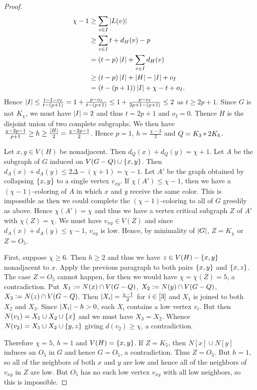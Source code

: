 \begin{proof}
\begin{align*}
	\chi - 1 &\geq \sum_{v \in I} \left|L(v)\right| \\
	&\geq \sum_{v \in I} t + d_H(v) - p \\
	&= (t-p)\left|I\right| + \sum_{v \in I} d_H(v) \\
	&\geq (t-p)\left|I\right| + \left|H\right| - \left|I\right| + o_I \\
	&= (t - (p + 1))\left|I\right| + \chi - t + o_I. 
\end{align*}
Hence $\left|I\right| \leq \frac{t-1 - o_I}{t - (p + 1)} = 1 +
\frac{p-o_I}{t-(p+1)} \leq 1 + \frac{p-o_I}{2p + 1 - (p+1)} \leq 2$ as $t \geq
2p + 1$.  Since $G$ is not $K_\chi$, we must
have $\left|I\right| = 2$ and thus $t = 2p + 1$ and $o_I = 0$.  Thence $H$ is the
disjoint union of two complete subgraphs.  We then have $\frac{\chi - 2p - 1}{p
+ 1} \geq h \geq \frac{\left|H\right|}{2} = \frac{\chi - 2p - 1}{2}$.  Hence $p =
1$, $h = \frac{\chi - 3}{2}$ and $Q = K_3 \mbox{\hspace{2 pt}$\ast$\hspace{2 pt}} 2K_h$.

Let $x,y \in V(H)$ be nonadjacent.  Then $d_Q(x) + d_Q(y) = \chi + 1$.  Let $A$
be the subgraph of $G$ induced on $V(G - Q) \cup \left\{ x,y \right\}$.  Then $d_A(x) + d_A(y) \leq 2\Delta - (\chi + 1) = \chi - 1$.  Let
$A'$ be the graph obtained by collapsing $\left\{ x, y \right\}$ to a single vertex
$v_{xy}$. If $\chi(A') \leq \chi - 1$, then we have a $(\chi - 1)$-coloring of
$A$ in which $x$ and $y$ receive the same color.  This is impossible as then we could
complete the $(\chi - 1)$-coloring to all of $G$ greedily as above.  Hence
$\chi(A') = \chi$ and thus we have a vertex critical subgraph $Z$ of $A'$ with
$\chi(Z) = \chi$.  We must have $v_{xy} \in V(Z)$ and since $d_A(x) + d_A(y)
\leq \chi - 1$, $v_{xy}$ is low.  Hence, by minimality of $\left|G\right|$, $Z =
K_\chi$ or $Z = O_5$.

First, suppose $\chi \geq 6$.  Then $h \geq 2$ and thus we have $z \in V(H) - \left\{ x, y \right\}$ nonadjacent to $x$.  
Apply the previous paragraph to both pairs $\left\{ x, y \right\}$ and $\left\{ x, z \right\}$.  
The case $Z = O_5$ cannot happen, for then we would have $\chi = \chi(Z) = 5$, a contradiction.  
Put $X_1 \mathrel{\mathop:}= N(x) \cap V(G - Q)$, $X_2 \mathrel{\mathop:}= N(y) \cap V(G - Q)$, $X_3 \mathrel{\mathop:}= N(z) \cap V(G - Q)$.  
Then $\left|X_i\right| = \frac{\chi - 1}{2}$ for $i \in \left[3\right]$ and $X_1$ is joined to both $X_2$ and $X_3$.  
Since $\left|X_i\right| - h > 0$, each $X_i$ contains a low vertex $v_i$.  But then
$N(v_1) = X_1 \cup X_2 \cup \left\{ x \right\}$ and we must have $X_3 = X_2$. Whence $N(v_2) = X_1 \cup X_2 \cup \left\{ y, z \right\}$ giving $d(v_2) \geq \chi$, a contradiction.

Therefore $\chi = 5$, $h = 1$ and $V(H) = \left\{ x, y \right\}$.  If $Z = K_5$, then $N[x] \cup N[y]$ induces an $O_5$ in $G$ and hence $G = O_5$, a contradiction.  
Thus $Z = O_5$.  But $h = 1$, so all of the neighbors of both $x$ and $y$ are
low and hence all of the neighbors of $v_{xy}$ in $Z$ are low. But $O_5$ has no such low vertex $v_{xy}$ with all low neighbors, so this is impossible.
	\end{proof}

